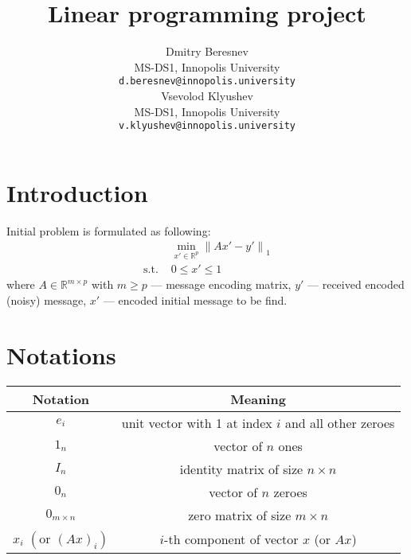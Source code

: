 \documentclass{article}
\title{Linear programming project}
\date{} 					%
\author{
  \hspace{1mm}Dmitry Beresnev \\
	MS-DS1, Innopolis University\\
	\texttt{d.beresnev@innopolis.university} \\
	\And{}
  \hspace{1mm}Vsevolod Klyushev \\
	MS-DS1, Innopolis University\\
	\texttt{v.klyushev@innopolis.university}
}
\def\R{\mathbb{R}}
\begin{document}
\maketitle


\section{Introduction}
Initial problem is formulated as following:
\begin{equation}\label{eq:init}
  \begin{aligned}
                 & \min\limits_{x' \in \R^p} {\| Ax'-y' \|}_1 \\
    \text{s.t. } & 0 \leq x' \leq 1
  \end{aligned}
\end{equation}
where $A \in \R^{m \times p}$ with $m \geq p$ --- message  encoding matrix,
$y'$ --- received encoded (noisy) message,
$x'$ --- encoded initial message to be find.

\section{Notations}

 {
  \renewcommand{\arraystretch}{1.5}
  \renewcommand{\tabcolsep}{10pt}
  \begin{table}[h]
    \centering
    \begin{tabular}{cc}
      \toprule
      \textbf{Notation}                          & \textbf{Meaning}                                     \\
      \midrule
      $e_i$                                      & unit vector with 1 at index $i$ and all other zeroes \\
      $1_n$                                      & vector of $n$ ones                                   \\
      $I_n$                                      & identity matrix of size $n \times n$                 \\
      $0_n$                                      & vector of $n$ zeroes                                 \\
      $0_{m \times n}$                           & zero matrix of size $m \times n$                     \\
      $x_i$ $\left( \text{or } {(Ax)}_i \right)$ & $i$-th component of vector $x$    (or $Ax$)          \\

      \bottomrule
    \end{tabular}
  \end{table}
 }
\end{document}
